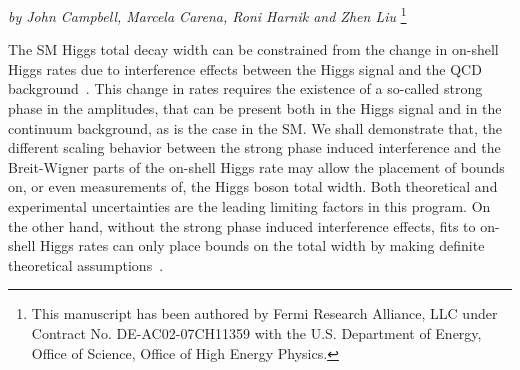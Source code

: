 
\begin{center}{\it by John Campbell, Marcela Carena, Roni Harnik and Zhen Liu} \footnote{This manuscript has been authored by Fermi Research Alliance, LLC under Contract No. DE-AC02-07CH11359 with the U.S. Department of Energy, Office of Science, Office of High Energy Physics.}\end{center}



The SM Higgs total decay width can be constrained from the change in on-shell Higgs rates due to interference effects between the Higgs signal and the QCD background~\cite{Campbell:2017rke}. This change in rates requires the existence of a so-called strong phase in the amplitudes, that can be present both  in the Higgs signal and in the continuum background, as is the case in the SM. We shall demonstrate that,
the different scaling behavior between   the strong phase induced interference  and the Breit-Wigner parts of the on-shell Higgs rate may allow the placement of bounds on, or even measurements of, the Higgs boson total width.
Both theoretical and experimental uncertainties are the leading  limiting factors in this program. On the other hand, without  the strong phase induced interference effects, fits to on-shell Higgs rates can only place bounds on the total width by making definite theoretical assumptions~\cite{Duhrssen:2004cv,LHCHiggsCrossSectionWorkingGroup:2012nn,Dobrescu:2012td}. 

